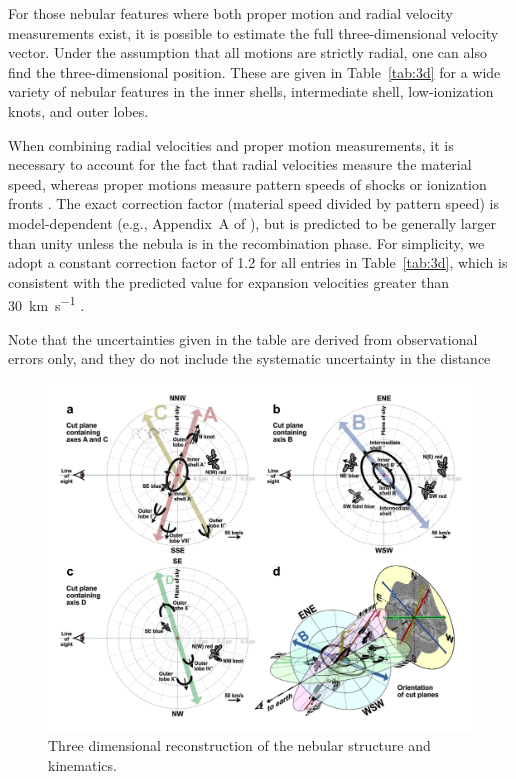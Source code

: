 \documentclass[useAMS, usenatbib]{mnras}
\begin{document}
For those nebular features where both proper motion and radial velocity measurements exist,
it is possible to estimate the full three-dimensional velocity vector.
Under the assumption that all motions are strictly radial,
one can also find the three-dimensional position.
These are given in Table~\ref{tab:3d} for a wide variety of nebular features
in the inner shells, intermediate shell, low-ionization knots, and outer lobes.

When combining radial velocities and proper motion measurements,
it is necessary to account for the fact that radial velocities measure the material speed,
whereas proper motions measure pattern speeds of shocks or ionization fronts \citep{Mellema:2004a}. 
The exact correction factor (material speed divided by pattern speed)
is model-dependent (e.g., Appendix~A of \citealp{ODell:2009c}),
but is predicted to be generally larger than unity
\citetext{see Fig.~8 of \citealp{Jacob:2013a}}
unless the nebula is in the recombination phase.
For simplicity, we adopt a constant correction factor of 1.2 for all entries in Table~\ref{tab:3d},
which is consistent with the predicted value for expansion velocities greater than \SI{30}{km.s^{-1}}
\citetext{see Fig.~3 of \citealp{Schonberner:2019a}}.

Note that the uncertainties given in the table are derived from observational errors only,
and they do not include the systematic uncertainty in the distance

\begin{figure}
  \includegraphics[width=\linewidth]
  {figs/cut-axis-4panel}
  \caption{Three dimensional reconstruction of the nebular structure and kinematics. }
  \label{fig:cut-axis-3d}
\end{figure}
\end{document}
